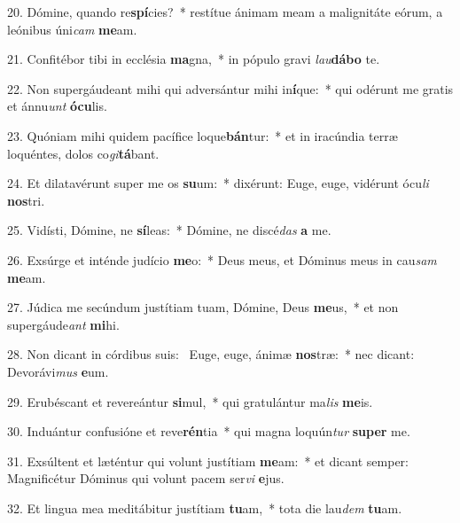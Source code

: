 20. Dómine, quando re\textbf{spí}cies?~*  restítue ánimam meam a malignitáte eórum, a leónibus úni\textit{cam} \textbf{me}am.\

21. Confitébor tibi in ecclésia \textbf{ma}gna,~*  in pópulo gravi \textit{lau}\textbf{dá}\textbf{bo} te.\

22. Non supergáudeant mihi qui adversántur mihi in\textbf{í}que:~*  qui odérunt me gratis et ánnu\textit{unt} \textbf{ó}\textbf{cu}lis.\

23. Quóniam mihi quidem pacífice loque\textbf{bán}tur:~*  et in iracúndia terræ loquéntes, dolos co\textit{gi}\textbf{tá}bant.\

24. Et dilatavérunt super me os \textbf{su}um:~*  dixérunt: Euge, euge, vidérunt ócu\textit{li} \textbf{nos}tri.\

25. Vidísti, Dómine, ne \textbf{sí}leas:~*  Dómine, ne discé\textit{das} \textbf{a} me.\

26. Exsúrge et inténde judício \textbf{me}o:~*  Deus meus, et Dóminus meus in cau\textit{sam} \textbf{me}am.\

27. Júdica me secúndum justítiam tuam, Dómine, Deus \textbf{me}us,~*  et non supergáude\textit{ant} \textbf{mi}hi.\

28. Non dicant in córdibus suis: \dag\  Euge, euge, ánimæ \textbf{nos}træ:~*  nec dicant: Devorávi\textit{mus} \textbf{e}um.\

29. Erubéscant et revereántur \textbf{si}mul,~*  qui gratulántur ma\textit{lis} \textbf{me}is.\

30. Induántur confusióne et reve\textbf{rén}tia~*  qui magna loquún\textit{tur} \textbf{su}\textbf{per} me.\

31. Exsúltent et læténtur qui volunt justítiam \textbf{me}am:~*  et dicant semper: Magnificétur Dóminus qui volunt pacem ser\textit{vi} \textbf{e}jus.\

32. Et lingua mea meditábitur justítiam \textbf{tu}am,~*  tota die lau\textit{dem} \textbf{tu}am.\

